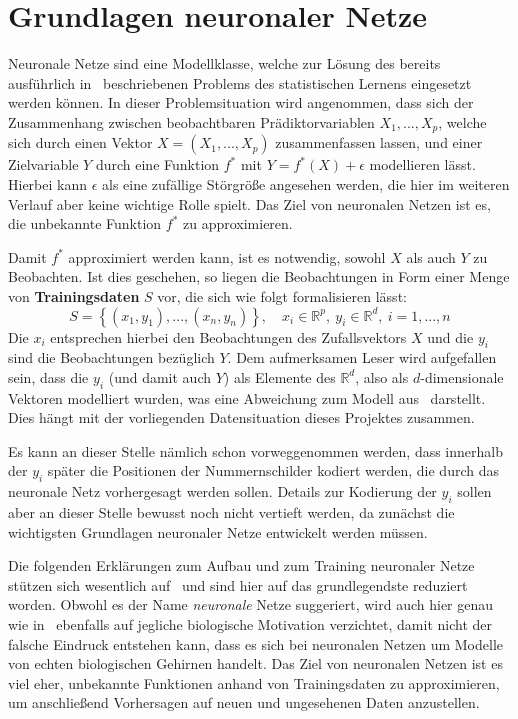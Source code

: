 \section{Grundlagen neuronaler Netze}
\label{sec:neuronale-netze}

Neuronale Netze sind eine Modellklasse, welche zur L\"osung des
bereits ausf\"uhrlich
in~\cite{statistical_learning} beschriebenen Problems des statistischen
Lernens eingesetzt werden k\"onnen.
In dieser Problemsituation wird angenommen, dass sich der Zusammenhang zwischen
beobachtbaren Pr\"adiktorvariablen $X_1, ..., X_p$, welche sich durch
einen Vektor $X = (X_1, ..., X_p)$ zusammenfassen lassen, und einer
Zielvariable $Y$ durch eine Funktion $f^*$ mit $Y = f^*(X) + \epsilon$
modellieren l\"asst. Hierbei kann $\epsilon$ als eine zuf\"allige
St\"orgr\"o{\ss}e angesehen werden, die hier im weiteren Verlauf aber
keine wichtige Rolle spielt.
Das Ziel von neuronalen Netzen ist es, die unbekannte Funktion $f^*$
zu approximieren.

Damit $f^*$ approximiert werden kann, ist es notwendig, sowohl $X$
als auch $Y$ zu Beobachten. Ist dies geschehen, so liegen die
Beobachtungen in Form einer Menge von \textbf{Trainingsdaten}
$S$ vor, die sich wie folgt formalisieren l\"asst:
\begin{equation}
    \label{eq:trainingsdaten}
    S = \left\{ (x_1, y_1), ..., (x_n, y_n) \right\},
    \quad x_i \in \mathbb{R}^p, \  y_i \in \mathbb{R}^d, \  i=1, ..., n
\end{equation}
Die $x_i$ entsprechen hierbei den Beobachtungen des Zufallsvektors $X$
und die $y_i$ sind die Beobachtungen bez\"uglich $Y$.
Dem aufmerksamen Leser wird aufgefallen sein, dass die $y_i$ (und damit auch $Y$)
als Elemente des $\mathbb{R}^d$, also als $d$-dimensionale Vektoren
modelliert wurden, was eine Abweichung zum Modell aus~\cite{statistical_learning}
darstellt. Dies h\"angt mit der vorliegenden Datensituation dieses
Projektes zusammen.

Es kann an dieser Stelle n\"amlich schon vorweggenommen werden,
dass innerhalb der $y_i$ sp\"ater die Positionen der Nummernschilder
kodiert werden,
die durch das neuronale Netz vorhergesagt werden sollen.
Details zur Kodierung der $y_i$ sollen aber
an dieser Stelle bewusst noch
nicht vertieft werden, da zun\"achst die wichtigsten Grundlagen neuronaler
Netze entwickelt werden m\"ussen.

Die folgenden Erkl\"arungen zum Aufbau und zum Training neuronaler Netze
st\"utzen sich wesentlich auf~\cite{Goodfellow-et-al-2016} und sind hier
auf das grundlegendste reduziert worden.
Obwohl es der Name \textit{neuronale} Netze suggeriert, wird auch hier
genau wie in~\cite{Goodfellow-et-al-2016} ebenfalls auf jegliche
biologische Motivation verzichtet, damit nicht der falsche Eindruck
entstehen kann, dass es sich bei neuronalen Netzen um Modelle von echten
biologischen Gehirnen handelt.
Das Ziel von neuronalen Netzen ist es viel eher, unbekannte Funktionen
anhand von Trainingsdaten zu approximieren, um anschlie{\ss}end Vorhersagen
auf neuen und ungesehenen Daten anzustellen.

